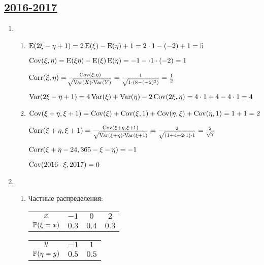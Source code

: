 \subsection[2016-2017]{\hyperref[sec:kr_02_2016_2017]{2016-2017}}
\label{sec:sol_kr_02_2016_2017}

\begin{enumerate}
\item \begin{enumerate}
\item $\E (2\xi - \eta +1) = 2 \E (\xi) - \E (\eta) + 1 = 2\cdot 1 - (-2) + 1 = 5 $

$\Cov (\xi, \eta) = \E (\xi \eta) - \E(\xi) \E(\eta) = -1 - \cdot 1 \cdot (-2) = 1$

$\Corr (\xi, \eta) = \frac{\Cov(\xi, \eta)}{\sqrt[]{\Var(X) \cdot \Var(Y)}} = \frac{1}{\sqrt{1 \cdot (8-(-2)^2)}} = \frac{1}{2}$

$\Var (2\xi - \eta + 1) = 4\Var(\xi) + \Var(\eta) - 2 \Cov (2\xi, \eta) = 4 \cdot 1 + 4 - 4 \cdot 1 = 4$

\item $\Cov(\xi + \eta, \xi + 1) = \Cov(\xi) + \Cov(\xi, 1) + \Cov(\eta, \xi) + \Cov(\eta, 1) = 1 +1 = 2$

$\Corr(\xi + \eta , \xi + 1) = \frac{\Cov(\xi + \eta , \xi + 1)}{\sqrt{\Var(\xi + \eta)\cdot \Var (\xi + 1)}} = \frac{2}{\sqrt{(1+4+2\cdot 1) \cdot 1}} = \frac{2}{\sqrt{7}}$

$\Corr(\xi + \eta - 24, 365 - \xi - \eta) = -1$

$\Cov(2016\cdot \xi, 2017) = 0$

\end{enumerate}
\item
\begin{enumerate}
\item Частные распределения:

\begin{center}
\begin{tabular}{cccc}
\toprule
$x$ & $-1$ & $0$ & $2$ \\
$\P(\xi = x)$ & $0.3$ & $0.4$ & $0.3$ \\ \bottomrule
\end{tabular}
\hspace{1cm}
\begin{tabular}{ccc}
\toprule
$y$ & $-1$ & $1$ \\
$\P(\eta = y)$ & $0.5$ & $0.5$ \\ \bottomrule
\end{tabular}
\end{center}


\end{enumerate}
\end{enumerate}
